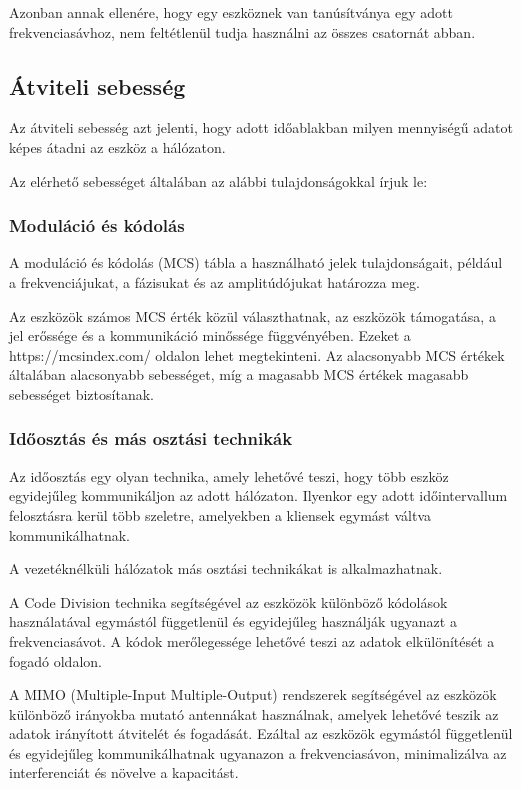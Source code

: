 \documentclass[12pt]{article}
\begin{document}
Azonban annak ellenére, hogy egy eszköznek van tanúsítványa egy adott frekvenciasávhoz, nem feltétlenül tudja használni az összes csatornát abban.

\subsection{Átviteli sebesség}

Az átviteli sebesség azt jelenti, hogy adott időablakban milyen mennyiségű adatot képes átadni az eszköz a hálózaton.

Az elérhető sebességet általában az alábbi tulajdonságokkal írjuk le:

\subsubsection{Moduláció és kódolás}

A moduláció és kódolás (MCS) tábla a használható jelek tulajdonságait, például a frekvenciájukat, a fázisukat és az amplitúdójukat határozza meg.

Az eszközök számos MCS érték közül választhatnak, az eszközök támogatása, a jel erőssége és a kommunikáció minőssége függvényében. Ezeket a https://mcsindex.com/ oldalon lehet megtekinteni. Az alacsonyabb MCS értékek általában alacsonyabb sebességet, míg a magasabb MCS értékek magasabb sebességet biztosítanak.

\subsubsection{Időosztás és más osztási technikák}

Az időosztás egy olyan technika, amely lehetővé teszi, hogy több eszköz egyidejűleg kommunikáljon az adott hálózaton.
Ilyenkor egy adott időintervallum felosztásra kerül
több szeletre, amelyekben a kliensek egymást váltva kommunikálhatnak.

A vezetéknélküli hálózatok más osztási technikákat is alkalmazhatnak.

A Code Division technika segítségével az eszközök különböző kódolások használatával egymástól függetlenül és egyidejűleg használják ugyanazt a frekvenciasávot. A kódok merőlegessége lehetővé teszi az adatok elkülönítését a fogadó oldalon.

A MIMO (Multiple-Input Multiple-Output) rendszerek segítségével az eszközök különböző irányokba mutató antennákat használnak, amelyek lehetővé teszik az adatok irányított átvitelét és fogadását. Ezáltal az eszközök egymástól függetlenül és egyidejűleg kommunikálhatnak ugyanazon a frekvenciasávon, minimalizálva az interferenciát és növelve a kapacitást.
\end{document}
